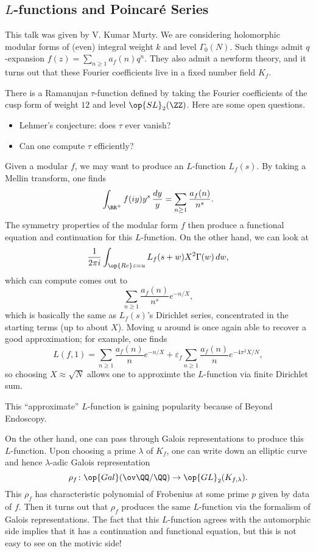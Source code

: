 \documentclass{article}
\begin{document}
\subsection{\texorpdfstring{$L$}{ L}-functions and Poincar\'e Series}
This talk was given by V. Kumar Murty. We are considering holomorphic modular forms of (even) integral weight $k$ and level $\Gamma_0(N)$. Such things admit $q$-expansion $f(z)=\sum_{n\ge1}a_f(n)q^n$. They also admit a newform theory, and it turns out that these Fourier coefficients live in a fixed number field $K_f$.
\begin{example}
	There is a Ramanujan $\tau$-function defined by taking the Fourier coefficients of the cusp form of weight $12$ and level $\op{SL}_2(\ZZ)$. Here are some open questions.
	\begin{itemize}
		\item Lehmer's conjecture: does $\tau$ ever vanish?
		\item Can one compute $\tau$ efficiently?
	\end{itemize}
\end{example}
Given a modular $f$, we may want to produce an $L$-function $L_f(s)$. By taking a Mellin transform, one finds
\[\int_{\RR^+}f(iy)y^s\,\frac{dy}y=\sum_{n\ge1}\frac{a_f(n)}{n^s}.\]
The symmetry properties of the modular form $f$ then produce a functional equation and continuation for this $L$-function. On the other hand, we can look at
\[\frac1{2\pi i}\int_{\op{Re}z=u}L_f(s+w)X^2\Gamma(w)\,dw,\]
which can compute comes out to
\[\sum_{n\ge1}\frac{a_f(n)}{n^s}e^{-n/X},\]
which is basically the same as $L_f(s)$'s Dirichlet series, concentrated in the starting terms (up to about $X$). Moving $u$ around is once again able to recover a good approximation; for example, one finds
\[L(f,1)=\sum_{n\ge1}\frac{a_f(n)}ne^{-n/X}+\varepsilon_f\sum_{n\ge1}\frac{a_f(n)}ne^{-4\pi^2X/N},\]
so choosing $X\approx\sqrt N$ allows one to approximte the $L$-function via finite Dirichlet sum.
\begin{remark}
	This ``approximate'' $L$-function is gaining popularity because of Beyond Endoscopy.
\end{remark}
On the other hand, one can pass through Galois representations to produce this $L$-function. Upon choosing a prime $\lambda$ of $K_f$, one can write down an elliptic curve and hence $\lambda$-adic Galois representation
\[\rho_f\colon\op{Gal}(\ov\QQ/\QQ)\to\op{GL}_2(K_{f,\lambda}).\]
This $\rho_f$ has characteristic polynomial of Frobenius at some prime $p$ given by data of $f$. Then it turns out that $\rho_f$ produces the same $L$-function via the formalism of Galois representations. The fact that this $L$-function agrees with the automorphic side implies that it has a continuation and functional equation, but this is not easy to see on the motivic side!
\end{document}
